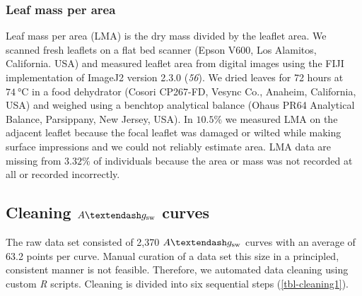 \documentclass[
  letterpaper,
  DIV=11,
  numbers=noendperiod]{scrartcl}
\newcommand{\agcurve}{$A \textendash g_\text{sw}$}
\begin{document}
\subsubsection{Leaf mass per area}\label{leaf-mass-per-area}

Leaf mass per area (LMA) is the dry mass divided by the leaflet area. We
scanned fresh leaflets on a flat bed scanner (Epson V600, Los Alamitos,
California. USA) and measured leaflet area from digital images using the
FIJI implementation of ImageJ2 version 2.3.0 (\emph{56}). We dried
leaves for 72 hours at \(\qty{74}{\degreeCelsius}\) in a food dehydrator
(Cosori CP267-FD, Vesync Co., Anaheim, California, USA) and weighed
using a benchtop analytical balance (Ohaus PR64 Analytical Balance,
Parsippany, New Jersey, USA). In \(10.5\%\) we measured LMA on the
adjacent leaflet because the focal leaflet was damaged or wilted while
making surface impressions and we could not reliably estimate area. LMA
data are missing from \(3.32\%\) of individuals because the area or mass
was not recorded at all or recorded incorrectly.

\subsection{\texorpdfstring{Cleaning \agcurve{}
curves}{Cleaning  curves}}\label{cleaning-curves}

The raw data set consisted of 2,370 \agcurve{} curves with an average of
63.2 points per curve. Manual curation of a data set this size in a
principled, consistent manner is not feasible. Therefore, we automated
data cleaning using custom \emph{R} scripts. Cleaning is divided into
six sequential steps (\autoref{tbl-cleaning1}).
\end{document}
